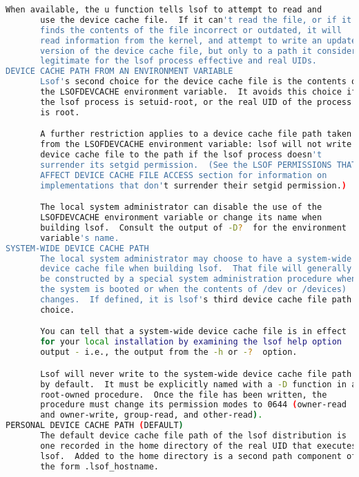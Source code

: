 {{\begin{lstlisting}[language=bash]
       When available, the u function tells lsof to attempt to read and
       use the device cache file.  If it can't read the file, or if it
       finds the contents of the file incorrect or outdated, it will
       read information from the kernel, and attempt to write an updated
       version of the device cache file, but only to a path it considers
       legitimate for the lsof process effective and real UIDs.
DEVICE CACHE PATH FROM AN ENVIRONMENT VARIABLE
       Lsof's second choice for the device cache file is the contents of
       the LSOFDEVCACHE environment variable.  It avoids this choice if
       the lsof process is setuid-root, or the real UID of the process
       is root.

       A further restriction applies to a device cache file path taken
       from the LSOFDEVCACHE environment variable: lsof will not write a
       device cache file to the path if the lsof process doesn't
       surrender its setgid permission.  (See the LSOF PERMISSIONS THAT
       AFFECT DEVICE CACHE FILE ACCESS section for information on
       implementations that don't surrender their setgid permission.)

       The local system administrator can disable the use of the
       LSOFDEVCACHE environment variable or change its name when
       building lsof.  Consult the output of -D?  for the environment
       variable's name.
SYSTEM-WIDE DEVICE CACHE PATH
       The local system administrator may choose to have a system-wide
       device cache file when building lsof.  That file will generally
       be constructed by a special system administration procedure when
       the system is booted or when the contents of /dev or /devices)
       changes.  If defined, it is lsof's third device cache file path
       choice.

       You can tell that a system-wide device cache file is in effect
       for your local installation by examining the lsof help option
       output - i.e., the output from the -h or -?  option.

       Lsof will never write to the system-wide device cache file path
       by default.  It must be explicitly named with a -D function in a
       root-owned procedure.  Once the file has been written, the
       procedure must change its permission modes to 0644 (owner-read
       and owner-write, group-read, and other-read).
PERSONAL DEVICE CACHE PATH (DEFAULT)
       The default device cache file path of the lsof distribution is
       one recorded in the home directory of the real UID that executes
       lsof.  Added to the home directory is a second path component of
       the form .lsof_hostname.


\end{lstlisting}}}
